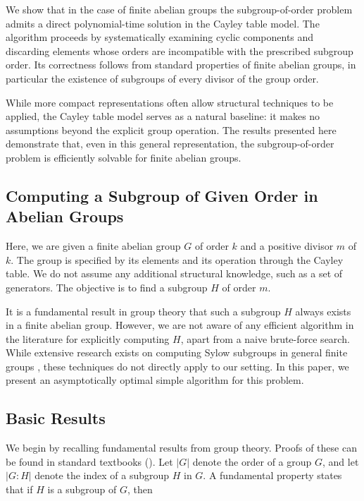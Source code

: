 \documentclass[11pt]{article}
\begin{document}
	We show that in the case of finite abelian groups
	the subgroup-of-order problem admits a direct polynomial-time solution
	in the Cayley table model.
	The algorithm proceeds by systematically examining cyclic components
	and discarding elements whose orders are incompatible
	with the prescribed subgroup order.
	Its correctness follows from standard properties of finite abelian groups,
	in particular the existence of subgroups of every divisor of the group order.
	
	While more compact representations often allow
	structural techniques to be applied,
	the Cayley table model serves as a natural baseline:
	it makes no assumptions beyond the explicit group operation.
	The results presented here demonstrate that,
	even in this general representation,
	the subgroup-of-order problem is efficiently solvable
	for finite abelian groups.

	\subsection{Computing a Subgroup of Given Order in Abelian Groups}
	
	Here, we are given a finite abelian group \( G \) of order \( k \) and a positive divisor \( m \) of \( k \). The group is specified by its elements and its operation through the Cayley table. We do not assume any additional structural knowledge, such as a set of generators. The objective is to find a subgroup \( H \) of order \( m \).  
	
	It is a fundamental result in group theory that such a subgroup \( H \) always exists in a finite abelian group. However, we are not aware of any efficient algorithm in the literature for explicitly computing \( H \), apart from a naive brute-force search. While extensive research exists on computing Sylow subgroups in general finite groups \cite{sylow1, sylow2, sylow3, sylow4}, these techniques do not directly apply to our setting. In this paper, we present an asymptotically optimal simple algorithm for this problem.
	

	\subsection{Basic Results}  
	
	We begin by recalling fundamental results from group theory. Proofs of these can be found in standard textbooks (\cite{hunger, lang}). Let \( |G| \) denote the order of a group \( G \), and let \( |G:H| \) denote the index of a subgroup \( H \) in \( G \). A fundamental property states that if \( H \) is a subgroup of \( G \), then  
	
\end{document}
